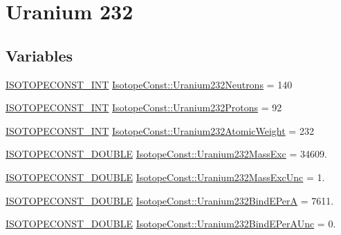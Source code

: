 \hypertarget{group___isotope_const-_uranium-_u232}{}\section{Uranium 232}
\label{group___isotope_const-_uranium-_u232}
\subsection*{Variables}
\begin{DoxyCompactItemize}
\item 
\mbox{\hyperlink{group___isotope_const-_macros_ga5f18360b3e99483a35c32d789e62621c}{I\+S\+O\+T\+O\+P\+E\+C\+O\+N\+S\+T\+\_\+\+I\+NT}} \mbox{\hyperlink{group___isotope_const-_uranium-_u232_gaccbebaada7d6fb397d15e64b536f3954}{Isotope\+Const\+::\+Uranium232\+Neutrons}} = 140
\item 
\mbox{\hyperlink{group___isotope_const-_macros_ga5f18360b3e99483a35c32d789e62621c}{I\+S\+O\+T\+O\+P\+E\+C\+O\+N\+S\+T\+\_\+\+I\+NT}} \mbox{\hyperlink{group___isotope_const-_uranium-_u232_gae3f42fd75d9858a8c7efdb96ab8d0202}{Isotope\+Const\+::\+Uranium232\+Protons}} = 92
\item 
\mbox{\hyperlink{group___isotope_const-_macros_ga5f18360b3e99483a35c32d789e62621c}{I\+S\+O\+T\+O\+P\+E\+C\+O\+N\+S\+T\+\_\+\+I\+NT}} \mbox{\hyperlink{group___isotope_const-_uranium-_u232_gae4f892dd8d91d0f5c3303a347e968bb6}{Isotope\+Const\+::\+Uranium232\+Atomic\+Weight}} = 232
\item 
\mbox{\hyperlink{group___isotope_const-_macros_ga8f45a7272ce02c0b4c65c44636ed719a}{I\+S\+O\+T\+O\+P\+E\+C\+O\+N\+S\+T\+\_\+\+D\+O\+U\+B\+LE}} \mbox{\hyperlink{group___isotope_const-_uranium-_u232_gaf69f7fda711ab96cafc7df32a0dc2dc6}{Isotope\+Const\+::\+Uranium232\+Mass\+Exc}} = 34609.
\item 
\mbox{\hyperlink{group___isotope_const-_macros_ga8f45a7272ce02c0b4c65c44636ed719a}{I\+S\+O\+T\+O\+P\+E\+C\+O\+N\+S\+T\+\_\+\+D\+O\+U\+B\+LE}} \mbox{\hyperlink{group___isotope_const-_uranium-_u232_gae9ac7af7620f132261b64e6c150d055d}{Isotope\+Const\+::\+Uranium232\+Mass\+Exc\+Unc}} = 1.
\item 
\mbox{\hyperlink{group___isotope_const-_macros_ga8f45a7272ce02c0b4c65c44636ed719a}{I\+S\+O\+T\+O\+P\+E\+C\+O\+N\+S\+T\+\_\+\+D\+O\+U\+B\+LE}} \mbox{\hyperlink{group___isotope_const-_uranium-_u232_gaa42d43dd4e7f4549cbad079a7be61ff6}{Isotope\+Const\+::\+Uranium232\+Bind\+E\+PerA}} = 7611.
\item 
\mbox{\hyperlink{group___isotope_const-_macros_ga8f45a7272ce02c0b4c65c44636ed719a}{I\+S\+O\+T\+O\+P\+E\+C\+O\+N\+S\+T\+\_\+\+D\+O\+U\+B\+LE}} \mbox{\hyperlink{group___isotope_const-_uranium-_u232_ga5ce23620956d15ed16cf45a2a9ce94db}{Isotope\+Const\+::\+Uranium232\+Bind\+E\+Per\+A\+Unc}} = 0.

\end{DoxyCompactItemize}
